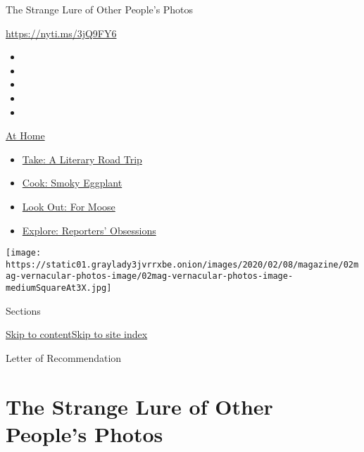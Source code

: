 The Strange Lure of Other People's Photos

\url{https://nyti.ms/3jQ9FY6}

\begin{itemize}
\item
\item
\item
\item
\item
\end{itemize}

\href{https://www.nytimes3xbfgragh.onion/spotlight/at-home?action=click\&pgtype=Article\&state=default\&region=TOP_BANNER\&context=at_home_menu}{At
Home}

\begin{itemize}
\tightlist
\item
  \href{https://www.nytimes3xbfgragh.onion/2020/07/28/books/time-for-a-literary-road-trip.html?action=click\&pgtype=Article\&state=default\&region=TOP_BANNER\&context=at_home_menu}{Take:
  A Literary Road Trip}
\item
  \href{https://www.nytimes3xbfgragh.onion/2020/07/29/magazine/bored-with-your-home-cooking-some-smoky-eggplant-will-fix-that.html?action=click\&pgtype=Article\&state=default\&region=TOP_BANNER\&context=at_home_menu}{Cook:
  Smoky Eggplant}
\item
  \href{https://www.nytimes3xbfgragh.onion/2020/07/27/travel/moose-michigan-isle-royale.html?action=click\&pgtype=Article\&state=default\&region=TOP_BANNER\&context=at_home_menu}{Look
  Out: For Moose}
\item
  \href{https://www.nytimes3xbfgragh.onion/interactive/2020/at-home/even-more-reporters-editors-diaries-lists-recommendations.html?action=click\&pgtype=Article\&state=default\&region=TOP_BANNER\&context=at_home_menu}{Explore:
  Reporters' Obsessions}
\end{itemize}

\texttt{[image: https://static01.graylady3jvrrxbe.onion/images/2020/02/08/magazine/02mag-vernacular-photos-image/02mag-vernacular-photos-image-mediumSquareAt3X.jpg]}

Sections

\protect\hyperlink{site-content}{Skip to
content}\protect\hyperlink{site-index}{Skip to site index}

Letter of Recommendation

\hypertarget{the-strange-lure-of-other-peoples-photos}{%
\section{The Strange Lure of Other People's
Photos}\label{the-strange-lure-of-other-peoples-photos}}


